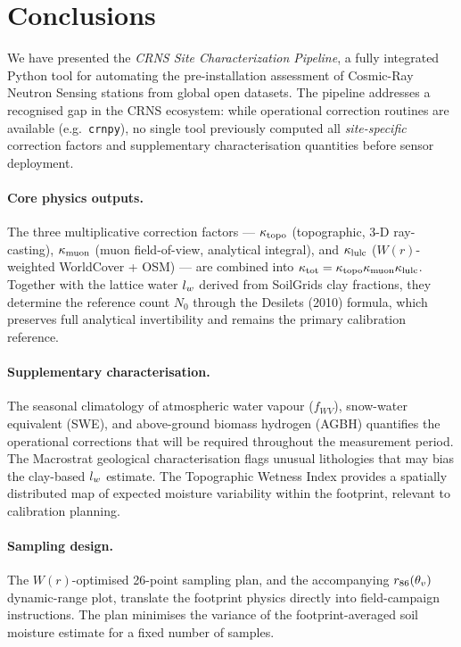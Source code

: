 \section{Conclusions}
\label{sec:conclusions}

We have presented the \emph{CRNS Site Characterization Pipeline},
a fully integrated Python tool for automating the pre-installation
assessment of Cosmic-Ray Neutron Sensing stations from global open
datasets.
The pipeline addresses a recognised gap in the CRNS ecosystem:
while operational correction routines are available (e.g.\
\texttt{crnpy}), no single tool previously computed all
\emph{site-specific} correction factors and supplementary
characterisation quantities before sensor deployment.

\paragraph{Core physics outputs.}
The three multiplicative correction factors — $\kappa_\mathrm{topo}$ (topographic,
3-D ray-casting), $\kappa_\mathrm{muon}$ (muon field-of-view, analytical integral),
and $\kappa_\mathrm{lulc}$ ($W(r)$-weighted WorldCover + OSM) — are combined into
$\kappa_\mathrm{tot} = \kappa_\mathrm{topo}\kappa_\mathrm{muon}\kappa_\mathrm{lulc}$.
Together with the lattice water $l_w$ derived from SoilGrids clay
fractions, they determine the reference count $N_0$ through the
Desilets (2010) formula, which preserves full analytical
invertibility and remains the primary calibration reference.

\paragraph{Supplementary characterisation.}
The seasonal climatology of atmospheric water vapour ($f_{WV}$),
snow-water equivalent (SWE), and above-ground biomass hydrogen
(AGBH) quantifies the operational corrections that will be required
throughout the measurement period.
The Macrostrat geological characterisation flags unusual lithologies
that may bias the clay-based $l_w$ estimate.
The Topographic Wetness Index provides a spatially distributed map
of expected moisture variability within the footprint, relevant to
calibration planning.

\paragraph{Sampling design.}
The $W(r)$-optimised 26-point sampling plan, and the accompanying
$r_{86}(\theta_v)$ dynamic-range plot, translate the footprint physics
directly into field-campaign instructions.
The plan minimises the variance of the footprint-averaged soil
moisture estimate for a fixed number of samples.

